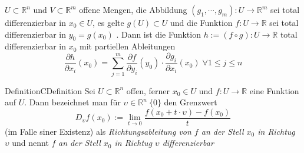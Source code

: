 $U\subset \mathbb{R} ^n$ und $V\subset \mathbb{R} ^m$ offene Mengen, die Abbildung
$ \left( g_1 , \cdots, g_{m} \right) : U \to \mathbb{R}^m  $ sei total differenzierbar in $ x_0 \in U $,
es gelte $ g(U) \subset U $ und die Funktion $ f: U \to \mathbb{R}  $ sei total differenzierbar in 
$ y_0 = g(x_0) $ . Dann ist die Funktion $ h:= (f \circ g): U \to \mathbb{R}  $ total differenzierbar in 
$ x_0 $ mit partiellen Ableitungen 
$$ \frac{\partial h}{\partial x_{i}} (x_0) = \sum_{j=1}^{m} \frac{\partial f }{\partial y_{i}} (y_0)
\cdot \frac{\partial g_{i}}{\partial x_{i}} (x_0)  \;  \forall 1 \leq j \leq n$$ 


\begin{ibox}[]{Definition}{CDefinition}
    Sei $ U \subset  \mathbb{R}^n  $ offen, ferner $ x_0 \in U $ und $ f: U \to \mathbb{R}  $ eine 
	Funktion auf $ U $. Dann bezeichnet man für $ \upsilon \in  \mathbb{R}^n \ \{0\} $ den Grenzwert 
	$$ D_{\upsilon}f(x_0) := \lim_{t \to 0} \frac{f(x_0 + t \cdot \upsilon)-f(x_0)}{t}  $$
	(im Falle siner Existenz) als \textit{Richtungsableitung von $ f $ an der Stell $ x_0 $ in Richtug $ \upsilon $ } 
	und nennt $ f $ \textit{ an der Stell $ x_0 $ in Richtug $ \upsilon $ differenzierbar} 
\end{ibox}

